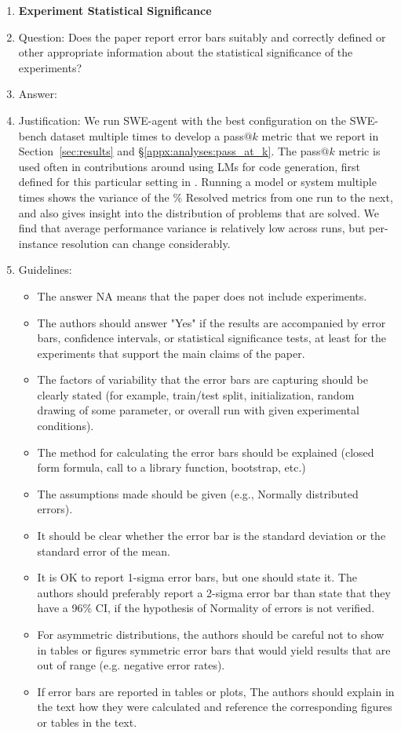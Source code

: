 \begin{enumerate}
\item {\bf Experiment Statistical Significance}
    \item[] Question: Does the paper report error bars suitably and correctly defined or other appropriate information about the statistical significance of the experiments?
    \item[] Answer: \answerYes{}
    \item[] Justification: We run SWE-agent with the best configuration on the SWE-bench dataset multiple times to develop a pass$@k$ metric that we report in Section~\ref{sec:results} and \S\ref{appx:analyses:pass_at_k}. The pass$@k$ metric is used often in contributions around using LMs for code generation, first defined for this particular setting in \citet{chen2021evaluating}.
    Running a model or system multiple times shows the variance of the \% Resolved metrics from one run to the next, and also gives insight into the distribution of problems that are solved.
    We find that average performance variance is relatively low across runs, but per-instance resolution can change considerably.
    \item[] Guidelines:
    \begin{itemize}
        \item The answer NA means that the paper does not include experiments.
        \item The authors should answer "Yes" if the results are accompanied by error bars, confidence intervals, or statistical significance tests, at least for the experiments that support the main claims of the paper.
        \item The factors of variability that the error bars are capturing should be clearly stated (for example, train/test split, initialization, random drawing of some parameter, or overall run with given experimental conditions).
        \item The method for calculating the error bars should be explained (closed form formula, call to a library function, bootstrap, etc.)
        \item The assumptions made should be given (e.g., Normally distributed errors).
        \item It should be clear whether the error bar is the standard deviation or the standard error of the mean.
        \item It is OK to report 1-sigma error bars, but one should state it. The authors should preferably report a 2-sigma error bar than state that they have a 96\% CI, if the hypothesis of Normality of errors is not verified.
        \item For asymmetric distributions, the authors should be careful not to show in tables or figures symmetric error bars that would yield results that are out of range (e.g. negative error rates).
        \item If error bars are reported in tables or plots, The authors should explain in the text how they were calculated and reference the corresponding figures or tables in the text.
    \end{itemize}


\end{enumerate}
